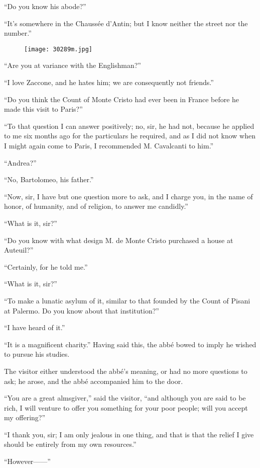 “Do you know his abode?”

“It’s somewhere in the Chaussée d’Antin; but I know neither the street
nor the number.”

\begin{figure}[ht]
\texttt{[image: 30289m.jpg]}
\end{figure}

“Are you at variance with the Englishman?”

“I love Zaccone, and he hates him; we are consequently not friends.”

“Do you think the Count of Monte Cristo had ever been in France before
he made this visit to Paris?”

“To that question I can answer positively; no, sir, he had not, because
he applied to me six months ago for the particulars he required, and as
I did not know when I might again come to Paris, I recommended M.
Cavalcanti to him.”

“Andrea?”

“No, Bartolomeo, his father.”

“Now, sir, I have but one question more to ask, and I charge you, in
the name of honor, of humanity, and of religion, to answer me
candidly.”

“What is it, sir?”

“Do you know with what design M. de Monte Cristo purchased a house at
Auteuil?”

“Certainly, for he told me.”

“What is it, sir?”

“To make a lunatic asylum of it, similar to that founded by the Count
of Pisani at Palermo. Do you know about that institution?”

“I have heard of it.”

“It is a magnificent charity.” Having said this, the abbé bowed to
imply he wished to pursue his studies.

The visitor either understood the abbé’s meaning, or had no more
questions to ask; he arose, and the abbé accompanied him to the door.

“You are a great almsgiver,” said the visitor, “and although you are
said to be rich, I will venture to offer you something for your poor
people; will you accept my offering?”

“I thank you, sir; I am only jealous in one thing, and that is that the
relief I give should be entirely from my own resources.”

“However——”

